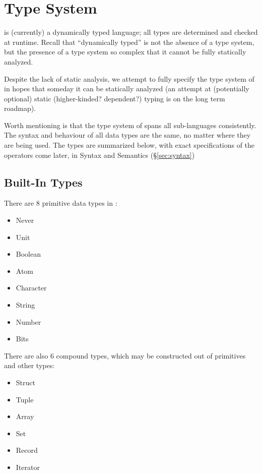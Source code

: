 \section{Type System}
\label{sec:types}

\Trilogy{} is (currently) a dynamically typed language; all types are determined
and checked at runtime. Recall that ``dynamically typed'' is not the absence of
a type system, but the presence of a type system so complex that it cannot be
fully statically analyzed.

Despite the lack of static analysis, we attempt to fully specify the type system
of \Trilogy{} in hopes that someday it can be statically analyzed (an attempt at
(potentially optional) static (higher-kinded? dependent?) typing is on the long
term roadmap).

Worth mentioning is that the type system of \Trilogy{} spans all sub-languages
consistently. The syntax and behaviour of all data types are the same, no matter
where they are being used. The types are summarized below, with exact specifications
of the operators come later, in Syntax and Semantics (\S\ref{sec:syntax})

\subsection{Built-In Types}

There are 8 primitive data types in \Trilogy{}:

\begin{itemize}
    \item Never
    \item Unit
    \item Boolean
    \item Atom
    \item Character
    \item String
    \item Number
    \item Bits
\end{itemize}

\noindent
There are also 6 compound types, which may be constructed out of primitives
and other types:

\begin{itemize}
    \item Struct
    \item Tuple
    \item Array
    \item Set
    \item Record
    \item Iterator
\end{itemize}

